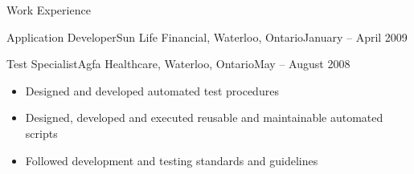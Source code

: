 \documentclass[11pt]{article}
\begin{document}
\begin{section}{Work Experience}
\begin{subsection}{Application Developer}{Sun Life Financial, Waterloo, Ontario}{January -- April 2009}
		\end{subsection}
			
		\begin{subsection}{Test Specialist}{Agfa Healthcare, Waterloo, Ontario}{May -- August 2008}
		
			\begin{itemize}
				\item Designed and developed automated test procedures
				\item Designed, developed and executed reusable and maintainable automated scripts
				\item Followed development and testing standards and guidelines
			\end{itemize}
			
		\end{subsection}
			
	\end{section}
	
\end{document}
